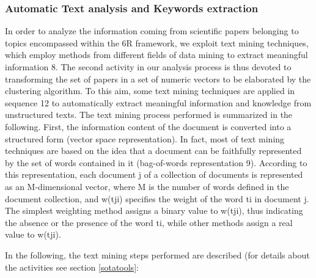 \documentclass[]{book}
\theoremstyle{definition}
\theoremstyle{definition}
\theoremstyle{definition}
\theoremstyle{remark}
\begin{document}
\subsubsection*{Automatic Text analysis and Keywords
extraction}\label{automatic-text-analysis-and-keywords-extraction}

In order to analyze the information coming from scientific papers
belonging to topics encompassed within the 6R framework, we exploit text
mining techniques, which employ methods from different fields of data
mining to extract meaningful information 8. The second activity in our
analysis process is thus devoted to transforming the set of papers in a
set of numeric vectors to be elaborated by the clustering algorithm. To
this aim, some text mining techniques are applied in sequence 12 to
automatically extract meaningful information and knowledge from
unstructured texts. The text mining process performed is summarized in
the following. First, the information content of the document is
converted into a structured form (vector space representation). In fact,
most of text mining techniques are based on the idea that a document can
be faithfully represented by the set of words contained in it
(bag-of-words representation 9). According to this representation, each
document j of a collection of documents is represented as an
M-dimensional vector, where M is the number of words defined in the
document collection, and w(tji) specifies the weight of the word ti in
document j. The simplest weighting method assigns a binary value to
w(tji), thus indicating the absence or the presence of the word ti,
while other methods assign a real value to w(tji).

In the following, the text mining steps performed are described (for
details about the activities see section \ref{sotatools}:
\end{document}

